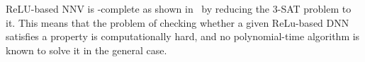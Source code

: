 \documentclass[oneside,11pt,dvipsnames]{book}
\numberwithin{equation}{section}
\theoremstyle{definition}
\theoremstyle{remark}
\newcommand{\tvn}[1]{\iftoggle{usecomment}{{\color{red}{[TVN]: #1}}}{}}
\begin{document}
ReLU-based NNV is \NP{}-complete as shown in~\cite{katz2017reluplex,salzer2023reachability} by reducing the 3-SAT problem to it. This means that the problem of checking whether a given ReLu-based DNN satisfies a property is computationally hard, and no polynomial-time algorithm is known to solve it in the general case.












\end{document}

